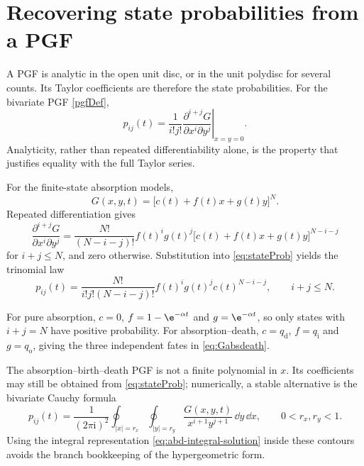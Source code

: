 \section{Recovering state probabilities from a PGF}
\label{app:extract}

A PGF is analytic in the open unit disc, or in the unit polydisc for several
counts.  Its Taylor coefficients are therefore the state probabilities.  For the
bivariate PGF \eqref{pgfDef},
\begin{equation}
  p_{ij}(t)=
  \frac{1}{i!j!}
  \left.
  \frac{\partial^{i+j}G}
  {\partial x^i\partial y^j}
  \right|_{x=y=0}.
  \label{eq:stateProb}
\end{equation}
Analyticity, rather than repeated differentiability alone, is the property that
justifies equality with the full Taylor series.

For the finite-state absorption models,
\begin{equation}
  G(x,y,t)=\bigl[c(t)+f(t)x+g(t)y\bigr]^N.
  \label{eq:multilinear}
\end{equation}
Repeated differentiation gives
\begin{equation}
  \frac{\partial^{i+j}G}{\partial x^i\partial y^j}
  =\frac{N!}{(N-i-j)!}
  f(t)^ig(t)^j
  \bigl[c(t)+f(t)x+g(t)y\bigr]^{N-i-j}
  \label{eq:multilinear-derivative}
\end{equation}
for \(i+j\leq N\), and zero otherwise.  Substitution into
\eqref{eq:stateProb} yields the trinomial law
\begin{equation}
  p_{ij}(t)=
  \frac{N!}{i!j!(N-i-j)!}
  f(t)^ig(t)^jc(t)^{N-i-j},
  \qquad i+j\leq N.
  \label{eq:stateProbSpec}
\end{equation}

For pure absorption, \(c=0\),
\(f=1-\e^{-\alpha t}\) and \(g=\e^{-\alpha t}\), so only states with
\(i+j=N\) have positive probability.  For absorption--death,
\(c=q_{\mathrm d}\), \(f=q_{\mathrm i}\) and \(g=q_{\mathrm o}\), giving the
three independent fates in \eqref{eq:Gabsdeath}.

The absorption--birth--death PGF is not a finite polynomial in \(x\).  Its
coefficients may still be obtained from \eqref{eq:stateProb}; numerically, a
stable alternative is the bivariate Cauchy formula
\begin{equation}
  p_{ij}(t)=\frac{1}{(2\pi\mathrm i)^2}
  \oint_{|x|=r_x}\oint_{|y|=r_y}
  \frac{G(x,y,t)}{x^{i+1}y^{j+1}}\,\dd y\,\dd x,
  \qquad 0<r_x,r_y<1.
  \label{eq:cauchy-coefficient}
\end{equation}
Using the integral representation \eqref{eq:abd-integral-solution} inside these
contours avoids the branch bookkeeping of the hypergeometric form.
